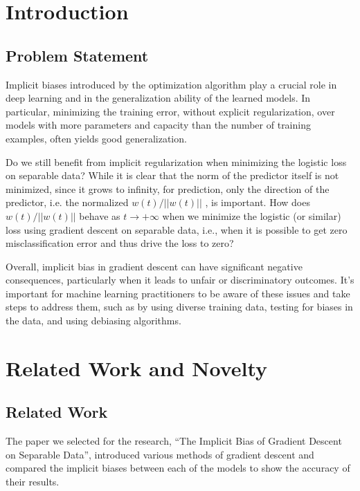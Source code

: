 \chapter {Introduction}

\section{Problem Statement}


Implicit biases introduced by the optimization algorithm play a crucial role in deep learning and in the generalization ability of the learned models. In particular, minimizing the training error, without explicit regularization, over models with more parameters and capacity than the number of training examples, often yields good generalization.

Do we still benefit from implicit regularization when minimizing the logistic loss on separable data? While it is clear that the norm of the predictor itself is not minimized, since it grows to infinity, for prediction, only the direction of the predictor, i.e. the normalized $w(t)/ ||w(t)||$ , is important. How does $w(t)/ ||w(t)||$ behave as $t \rightarrow +\infty$ when we minimize the logistic (or similar) loss using gradient descent on separable data, i.e., when it is possible to get zero misclassification error and thus drive the loss to zero?

Overall, implicit bias in gradient descent can have significant negative consequences, particularly when it leads to unfair or discriminatory outcomes. It's important for machine learning practitioners to be aware of these issues and take steps to address them, such as by using diverse training data, testing for biases in the data, and using debiasing algorithms.

\chapter{Related Work and Novelty}

\section{Related Work}

The paper we selected for the research, “The Implicit Bias of Gradient Descent on Separable Data”, introduced various methods of gradient descent and compared the implicit biases between each of the models to show the accuracy of their results.

